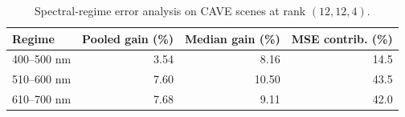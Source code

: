 \begin{table}[!t]
  \centering
  \caption{Spectral-regime error analysis on CAVE scenes at rank $(12,12,4)$.}
  \label{tab:error-regime-mechanism}
  \scriptsize
  \begin{tabular}{@{}lrrr@{}}
    \toprule
    Regime & Pooled gain (\%) & Median gain (\%) & MSE contrib. (\%) \\
    \midrule
    400--500 nm & 3.54 & 8.16 & 14.5 \\
    510--600 nm & 7.60 & 10.50 & 43.5 \\
    610--700 nm & 7.68 & 9.11 & 42.0 \\
    \bottomrule
  \end{tabular}
\end{table}

